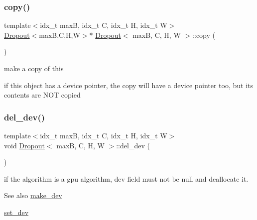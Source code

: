 \subsubsection{\texorpdfstring{copy()}{copy()}}
{\footnotesize\ttfamily template$<$idx\+\_\+t maxB, idx\+\_\+t C, idx\+\_\+t H, idx\+\_\+t W$>$ \\
\hyperlink{structDropout}{Dropout}$<$maxB,C,H,W$>$$\ast$ \hyperlink{structDropout}{Dropout}$<$ maxB, C, H, W $>$\+::copy (\begin{DoxyParamCaption}{ }\end{DoxyParamCaption})\hspace{0.3cm}{\ttfamily [inline]}}



make a copy of this 

if this object has a device pointer, the copy will have a device pointer too, but its contents are N\+OT copied \mbox{\label{structDropout_a34adb045be5a2a9546ff99fec3ba1f30}} 
\subsubsection{\texorpdfstring{del\+\_\+dev()}{del\_dev()}}
{\footnotesize\ttfamily template$<$idx\+\_\+t maxB, idx\+\_\+t C, idx\+\_\+t H, idx\+\_\+t W$>$ \\
void \hyperlink{structDropout}{Dropout}$<$ maxB, C, H, W $>$\+::del\+\_\+dev (\begin{DoxyParamCaption}{ }\end{DoxyParamCaption})\hspace{0.3cm}{\ttfamily [inline]}}



if the algorithm is a gpu algorithm, dev field must not be null and deallocate it. 

\begin{DoxySeeAlso}{See also}
\hyperlink{structDropout_ad1ea86b3d3240a95c9b8c52756ef23a9}{make\+\_\+dev} 

\hyperlink{structDropout_aacd2c2da4fb3bd6718b2b43bc26538b9}{set\+\_\+dev} 
\end{DoxySeeAlso}
\mbox{\label{structDropout_a155eb3ad77df591bdd95645fec1f2089}} 
